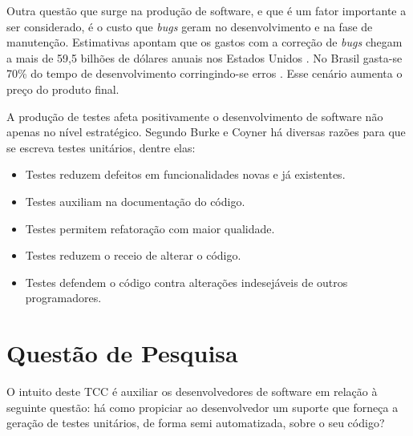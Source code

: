   \indent Outra questão que surge na produção de software, e que é um fator importante a ser considerado, é o custo que \textit{bugs} geram no desenvolvimento e na fase de manutenção. Estimativas apontam que os gastos com a correção de \textit{bugs} chegam a mais de 59,5 bilhões de dólares anuais nos Estados Unidos \cite{jantti_2008}. No Brasil gasta-se 70\% do tempo de desenvolvimento corringindo-se erros \cite{janones_2010}. Esse cenário aumenta o preço do produto final.
  \par
  \indent A produção de testes afeta positivamente o desenvolvimento de software não apenas no nível estratégico. Segundo Burke e Coyner \cite{burke_coyner_2003} há diversas razões para que se escreva testes unitários, dentre elas:
  \begin{itemize}
    \item Testes reduzem defeitos em funcionalidades novas e já existentes.
    \item Testes auxiliam na documentação do código.
    \item Testes permitem refatoração com maior qualidade.
    \item Testes reduzem o receio de alterar o código.
    \item Testes defendem o código contra alterações indesejáveis de outros programadores.
  \end{itemize}

 \section{Questão de Pesquisa}
O intuito deste TCC é auxiliar os desenvolvedores de software em relação à seguinte questão: há como propiciar ao desenvolvedor um suporte que forneça a geração de testes unitários, de forma semi automatizada, sobre o seu código?

